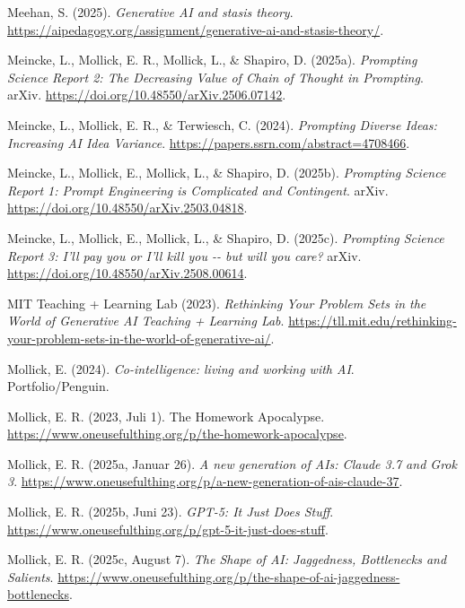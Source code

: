 \documentclass[
  ngerman,
  letterpaper,
  DIV=11]{scrreprt}
\newlength{\cslhangindent}
\newenvironment{CSLReferences}[2] %
 {\begin{list}{}{%
  \setlength{\itemindent}{0pt}
  \setlength{\leftmargin}{0pt}
  \setlength{\parsep}{0pt}
  \ifodd #1
   \setlength{\leftmargin}{\cslhangindent}
   \setlength{\itemindent}{-1\cslhangindent}
  \fi
  \setlength{\itemsep}{#2\baselineskip}}}
 {\end{list}}
\begin{document}
\begin{CSLReferences}{1}{0}
Meehan, S. (2025). \emph{Generative AI and stasis theory}.
\url{https://aipedagogy.org/assignment/generative-ai-and-stasis-theory/}.

Meincke, L., Mollick, E. R., Mollick, L., \& Shapiro, D. (2025a).
\emph{Prompting Science Report 2: The Decreasing Value of Chain of
Thought in Prompting}. arXiv.
\url{https://doi.org/10.48550/arXiv.2506.07142}.

Meincke, L., Mollick, E. R., \& Terwiesch, C. (2024). \emph{Prompting
Diverse Ideas: Increasing AI Idea Variance}.
\url{https://papers.ssrn.com/abstract=4708466}.

Meincke, L., Mollick, E., Mollick, L., \& Shapiro, D. (2025b).
\emph{Prompting Science Report 1: Prompt Engineering is Complicated and
Contingent}. arXiv. \url{https://doi.org/10.48550/arXiv.2503.04818}.

Meincke, L., Mollick, E., Mollick, L., \& Shapiro, D. (2025c).
\emph{Prompting Science Report 3: I'll pay you or I'll kill you -\/- but
will you care?} arXiv. \url{https://doi.org/10.48550/arXiv.2508.00614}.

MIT Teaching + Learning Lab (2023). \emph{Rethinking Your Problem Sets
in the World of Generative AI \textbar{} Teaching + Learning Lab}.
\url{https://tll.mit.edu/rethinking-your-problem-sets-in-the-world-of-generative-ai/}.

Mollick, E. (2024). \emph{Co-intelligence: living and working with AI}.
Portfolio/Penguin.

Mollick, E. R. (2023, Juli 1). The Homework Apocalypse.
\url{https://www.oneusefulthing.org/p/the-homework-apocalypse}.

Mollick, E. R. (2025a, Januar 26). \emph{A new generation of AIs: Claude
3.7 and Grok 3}.
\url{https://www.oneusefulthing.org/p/a-new-generation-of-ais-claude-37}.

Mollick, E. R. (2025b, Juni 23). \emph{GPT-5: It Just Does Stuff}.
\url{https://www.oneusefulthing.org/p/gpt-5-it-just-does-stuff}.

Mollick, E. R. (2025c, August 7). \emph{The Shape of AI: Jaggedness,
Bottlenecks and Salients}.
\url{https://www.oneusefulthing.org/p/the-shape-of-ai-jaggedness-bottlenecks}.


\end{CSLReferences}
\end{document}
